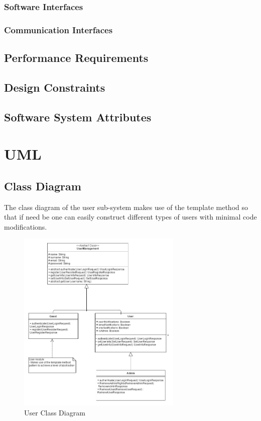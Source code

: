 	\subsubsection{Software Interfaces } %
	\subsubsection{Communication Interfaces } %
	
\subsection{Performance Requirements} %


\subsection{Design Constraints}



\subsection{Software System Attributes} %


\section{UML}
\subsection{Class Diagram}
The class diagram of the user sub-system makes use of the template method so that if need be one can easily construct different types of users with minimal code modifications.


\begin{figure}[H]
	\centering
	\includegraphics[width=0.7\textwidth]{user/img/UserClassDiagram.jpg}
	\caption{User Class Diagram}
\end{figure}



